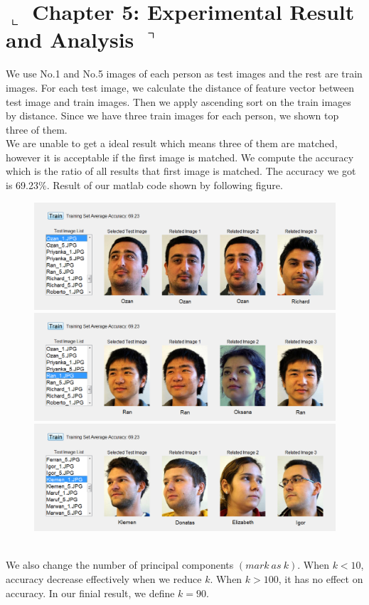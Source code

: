 \documentclass[]{article}
\begin{document}
\section*{ $\llcorner$  Chapter 5: Experimental Result and Analysis $\urcorner$}
We use No.1 and No.5 images of each person as test images and the rest are train images. For each test image, we calculate the distance of feature vector between test image and train images. Then we apply ascending sort on the train images by distance. Since we have three train images for each person, we shown top three of them.
\\

We are unable to get a ideal result which means three of them are matched, however it is acceptable if the first image is matched. We compute the accuracy which is the ratio of all results that first image is matched. The accuracy we got is 69.23$ \% $. Result of our matlab code shown by following figure.
\begin{figure}[h]
\centering
\includegraphics[width=0.7\linewidth]{./PCA2.png}
\includegraphics[width=0.7\linewidth]{./PCA4.png}
\includegraphics[width=0.7\linewidth]{./PCA5.png}
\caption{}
\end{figure}
\\

We also change the number of principal components $ (mark \ as \ k ) $. When $ k < 10 $, accuracy decrease effectively when we reduce $ k $. When $ k > 100 $, it has no effect on accuracy. In our finial result, we define $ k = 90 $.
\end{document}
